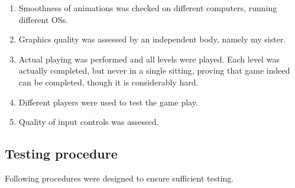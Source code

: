 \documentclass[11pt,a4paper,notitlepage]{report}
\newcommand{\dsubsection}[1]{\FloatBarrier \subsection{#1}}
\begin{document}
				\begin{enumerate}
					\item
						Smoothness of animations was checked on different computers, running different OSs.
					\item
						Graphics quality was assessed by an independent body, namely my sister.
					\item
						Actual playing was performed and all levels were played. Each level was actually completed, but never in a single sitting, proving that game indeed can be completed, though it is considerably hard.
					\item
						Different players were used to test the game play.
					\item
						Quality of input controls was assessed.
				\end{enumerate}
			\dsubsection{Testing procedure}
				Following procedures were designed to ensure sufficient testing.
\end{document}
